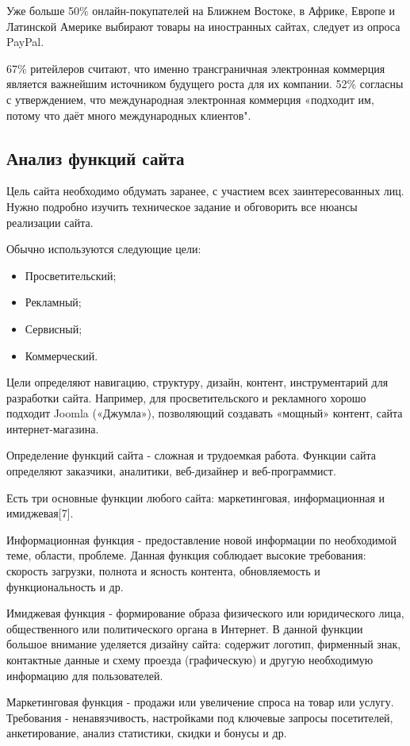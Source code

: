 Уже больше 50\% онлайн-покупателей на Ближнем Востоке, в Африке, Европе и Латинской Америке выбирают товары на иностранных сайтах, следует из опроса PayPal.

67\% ритейлеров считают, что именно трансграничная электронная коммерция является важнейшим источником будущего роста для их компании.
52\% согласны с утверждением, что международная электронная коммерция «подходит им, потому что даёт много международных клиентов".


\subsection{Анализ функций сайта}
Цель сайта необходимо обдумать заранее, с участием всех заинтересованных лиц.
Нужно подробно изучить техническое задание и обговорить все нюансы реализации сайта.

Обычно используются следующие цели:
\begin{itemize}
  \item Просветительский;
  \item Рекламный;
  \item Сервисный;
  \item Коммерческий.
\end{itemize}

Цели определяют навигацию, структуру, дизайн, контент, инструментарий для разработки сайта.
Например, для просветительского и рекламного хорошо подходит Joomla («Джумла»), позволяющий создавать «мощный» контент, сайта интернет-магазина.

Определение функций сайта - сложная и трудоемкая работа.
Функции сайта определяют заказчики, аналитики, веб-дизайнер и веб-программист.

Есть три основные функции любого сайта: маркетинговая, информационная и имиджевая[7].

Информационная функция - предоставление новой информации по необходимой теме, области, проблеме.
Данная функция соблюдает высокие требования: скорость загрузки, полнота и ясность контента, обновляемость и функциональность и др.

Имиджевая функция - формирование образа физического или юридического лица, общественного или политического органа в Интернет.
В данной функции большое внимание уделяется дизайну сайта: содержит логотип, фирменный знак, контактные данные и схему проезда (графическую) и другую необходимую информацию для пользователей.

Маркетинговая функция - продажи или увеличение спроса на товар или услугу.
Требования - ненавязчивость, настройками под ключевые запросы посетителей, анкетирование, анализ статистики, скидки и бонусы и др.

